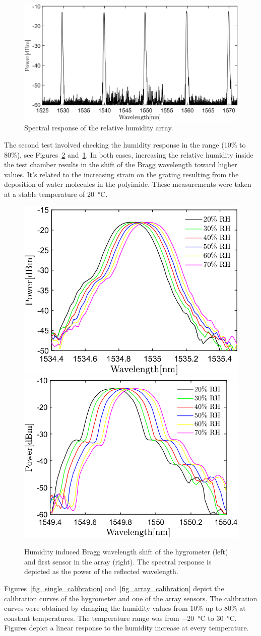 \begin{figure}[!h]
\centering
\includegraphics[width=0.85\columnwidth]{Chapter5/images/rh_array.png}
\caption{Spectral response of the relative humidity array.}
\label{fig_array_wavelength}
\end{figure}

The second test involved checking the humidity response in the range (10\% to 80\%), see Figures~\ref{fig_response} and~\ref{fig_array_wavelength}. In both cases, increasing the relative humidity inside the test chamber results in the shift of the Bragg wavelength toward higher values. It's related to the increasing strain on the grating resulting from the deposition of water molecules in the polyimide. These measurements were taken at a stable temperature of \SI{20}{\celsius}.
\begin{figure}[!h]
\centering
\includegraphics[width=0.45\columnwidth]{Chapter5/images/rh.png}
\includegraphics[width=0.475\columnwidth]{Chapter5/images/rh_array2.png}
\caption{Humidity induced Bragg wavelength shift of the hygrometer (left) and first sensor in the array (right). The spectral response is depicted as the power of the reflected wavelength. }
\label{fig_response}
\end{figure}
\newpage
Figures~\ref{fig_single_calibration} and~\ref{fig_array_calibration} depict the calibration curves of the hygrometer and one of the array sensors. The calibration curves were obtained by changing the humidity values from 10\% up to 80\% at constant temperatures. The temperature range was from \SI{-20}{\celsius} to \SI{30}{\celsius}. Figures depict a linear response to the humidity increase at every temperature.

